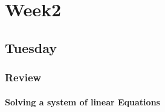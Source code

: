
\chapter{Week2}

\section{Tuesday}
\subsection{Review}
\subsubsection{Solving a system of linear Equations}
